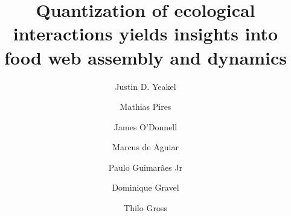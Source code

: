 \documentclass[twocolumn,preprintnumbers,amsmath,amssymb,superscriptaddress]{revtex4}
\begin{document}
\author{Justin D. Yeakel} 

\author{Mathias Pires} \affiliation{}

\author{James O'Donnell} \affiliation{}

\author{Marcus de Aguiar} \affiliation{}

\author{Paulo Guimar\~aes Jr} \affiliation{}

\author{Dominique Gravel} \affiliation{}

\author{Thilo Gross} \affiliation{}

\title{Quantization of ecological interactions yields insights into food web assembly and dynamics}
\end{document}
